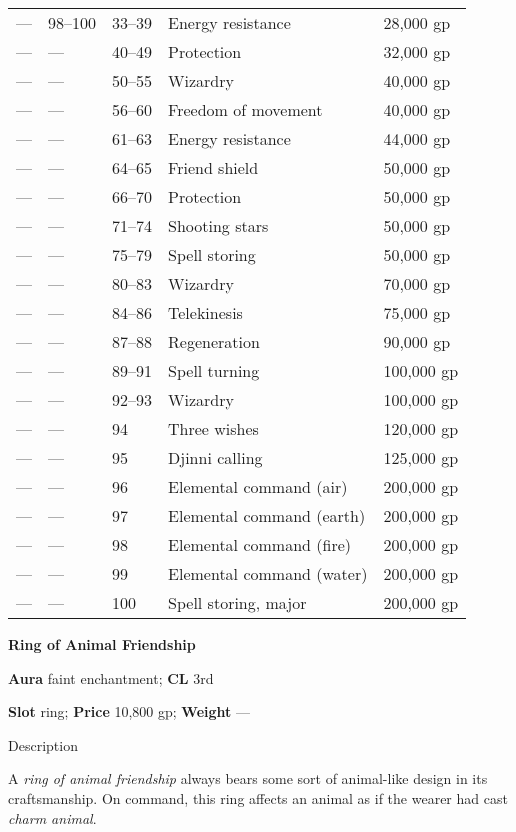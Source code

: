 \begin{table}[]
\begin{tabularx}{\linewidth}{lllXl}
 --- & 98--100 & 33--39 & Energy resistance & 28,000 gp \\
 --- & --- & 40--49 & Protection & 32,000 gp \\
 --- & --- & 50--55 & Wizardry & 40,000 gp \\
 --- & --- & 56--60 & Freedom of movement & 40,000 gp \\
 --- & --- & 61--63 & Energy resistance & 44,000 gp \\
 --- & --- & 64--65 & Friend shield & 50,000 gp \\
 --- & --- & 66--70 & Protection & 50,000 gp \\
 --- & --- & 71--74 & Shooting stars & 50,000 gp \\
 --- & --- & 75--79 & Spell storing & 50,000 gp \\
 --- & --- & 80--83 & Wizardry & 70,000 gp \\
 --- & --- & 84--86 & Telekinesis & 75,000 gp \\
 --- & --- & 87--88 & Regeneration & 90,000 gp \\
 --- & --- & 89--91 & Spell turning & 100,000 gp \\
 --- & --- & 92--93 & Wizardry & 100,000 gp \\
 --- & --- & 94 & Three wishes & 120,000 gp \\
 --- & --- & 95 & Djinni calling & 125,000 gp \\
 --- & --- & 96 & Elemental command (air) & 200,000 gp  \\
 --- & --- & 97 & Elemental command (earth) & 200,000 gp \\
 --- & --- & 98 & Elemental command (fire) & 200,000 gp \\
 --- & --- & 99 & Elemental command (water) & 200,000 gp \\
 --- & --- & 100 & Spell storing, major & 200,000 gp\\
\end{tabularx}
\end{table}

\textbf{Ring of Animal Friendship}
				
\textbf{Aura} faint enchantment;\textbf{ CL }3rd
				
\textbf{Slot} ring; \textbf{Price} 10,800 gp; \textbf{Weight} ---
				
Description
				
A \textit{ring of animal friendship} always bears some sort of animal-like design in its craftsmanship. On command, this ring affects an animal as if the wearer had cast \textit{charm animal}. 
				
